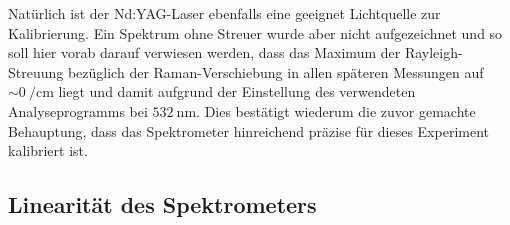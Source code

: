 \documentclass[../bericht.tex]{subfiles}
\begin{document}
        Natürlich ist der Nd:YAG-Laser ebenfalls eine geeignet Lichtquelle zur Kalibrierung. Ein Spektrum ohne Streuer wurde aber nicht aufgezeichnet und so soll hier vorab darauf verwiesen werden, dass das Maximum der Rayleigh-Streuung bezüglich der Raman-Verschiebung in allen späteren Messungen auf $\sim\SI{0}{\per\centi\meter}$ liegt und damit aufgrund der Einstellung des verwendeten Analyseprogramms bei $\SI{532}{\nano\meter}$. Dies bestätigt wiederum die zuvor gemachte Behauptung, dass das Spektrometer hinreichend präzise für dieses Experiment kalibriert ist.


      \subsection{Linearität des Spektrometers}
      \label{subsec:linearitaet}
\end{document}
